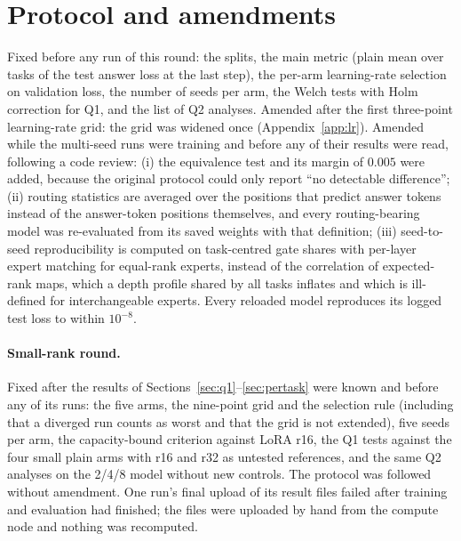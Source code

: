\documentclass[11pt]{article}
\begin{document}
\section{Protocol and amendments}
\label{app:protocol}
Fixed before any run of this round: the splits, the main metric (plain mean over tasks of the
test answer loss at the last step), the per-arm learning-rate selection on validation loss, the
number of seeds per arm, the Welch tests with Holm correction for Q1, and the list of Q2
analyses. Amended after the first three-point learning-rate grid: the grid was widened once
(Appendix~\ref{app:lr}). Amended while the multi-seed runs were training and before any of their
results were read, following a code review: (i) the equivalence test and its margin of $0.005$
were added, because the original protocol could only report ``no detectable difference'';
(ii) routing statistics are averaged over the positions that predict answer tokens instead of
the answer-token positions themselves, and every routing-bearing model was re-evaluated from
its saved weights with that definition; (iii) seed-to-seed reproducibility is computed on
task-centred gate shares with per-layer expert matching for equal-rank experts, instead of the
correlation of expected-rank maps, which a depth profile shared by all tasks inflates and which
is ill-defined for interchangeable experts. Every reloaded model reproduces its logged test loss
to within $10^{-8}$.

\paragraph{Small-rank round.} Fixed after the results of Sections~\ref{sec:q1}--\ref{sec:pertask}
were known and before any of its runs: the five arms, the nine-point grid and the selection rule
(including that a diverged run counts as worst and that the grid is not extended), five seeds
per arm, the capacity-bound criterion against LoRA r16, the Q1 tests against the four small
plain arms with r16 and r32 as untested references, and the same Q2 analyses on the 2/4/8 model
without new controls. The protocol was followed without amendment. One run's final upload of
its result files failed after training and evaluation had finished; the files were uploaded by
hand from the compute node and nothing was recomputed.
\end{document}
